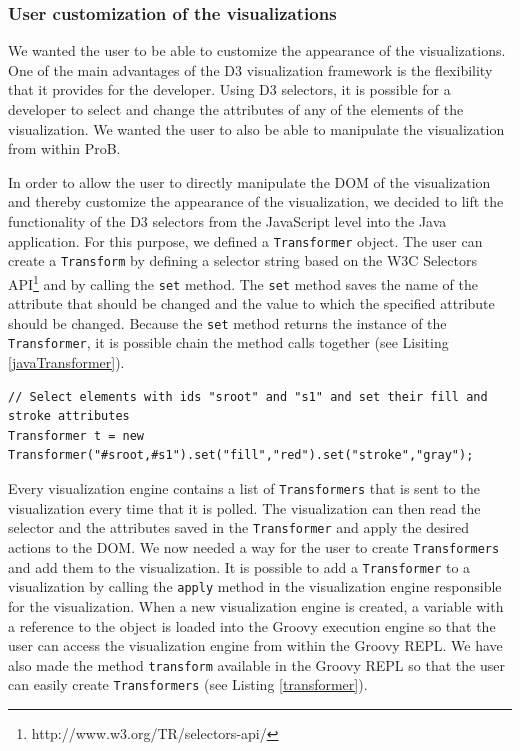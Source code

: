 \subsubsection{User customization of the visualizations}

We wanted the user to be able to customize the appearance of the visualizations. One of the main advantages of the D3 visualization framework is the flexibility that it provides for the developer. Using D3 selectors, it is possible for a developer to select and change the attributes of any of the elements of the visualization. We wanted the user to also be able to manipulate the visualization from within ProB. 

In order to allow the user to directly manipulate the DOM of the visualization and thereby customize the appearance of the visualization, we decided to lift the functionality of the D3 selectors from the JavaScript level into the Java application. For this purpose, we defined a \texttt{Transformer} object. The user can create a \texttt{Transform} by defining a selector string based on the W3C Selectors API\footnote{http://www.w3.org/TR/selectors-api/} and by calling the \texttt{set} method. The \texttt{set} method saves the name of the attribute that should be changed and the value to which the specified attribute should be changed. Because the \texttt{set} method returns the instance of the \texttt{Transformer}, it is possible chain the method calls together (see Lisiting \ref{javaTransformer}).

\lstset{language=java}
\begin{lstlisting}[caption=Define a \texttt{Transformer} in Java,label=javaTransformer]
// Select elements with ids "sroot" and "s1" and set their fill and stroke attributes
Transformer t = new Transformer("#sroot,#s1").set("fill","red").set("stroke","gray");
\end{lstlisting}

Every visualization engine contains a list of \texttt{Transformers} that is sent to the visualization every time that it is polled. The visualization can then read the selector and the attributes saved in the \texttt{Transformer} and apply the desired actions to the DOM. We now needed a way for the user to create \texttt{Transformers} and add them to the visualization. It is possible to add a \texttt{Transformer} to a visualization by calling the \texttt{apply} method in the visualization engine responsible for the visualization. When a new visualization engine is created, a variable with a reference to the object is loaded into the Groovy execution engine so that the user can access the visualization engine from within the Groovy REPL. We have also made the method \texttt{transform} available in the Groovy REPL so that the user can easily create \texttt{Transformers} (see Listing \ref{transformer}).

